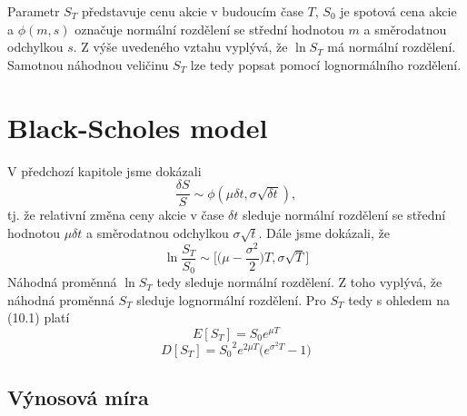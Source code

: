\documentclass[a4paper]{book}
\begin{document}
Parametr $S_T$ představuje cenu akcie v budoucím čase $T$, $S_0$ je spotová cena akcie a $\phi(m,s)$ označuje normální rozdělení se střední hodnotou $m$ a směrodatnou odchylkou $s$. Z výše uvedeného vztahu vyplývá, že $\ln S_T$ má normální rozdělení. Samotnou náhodnou veličinu $S_T$ lze tedy popsat pomocí lognormálního rozdělení.

\chapter{Black-Scholes model}

V předchozí kapitole jsme dokázali
\begin{equation*}
\frac{\delta S}{S} \sim \phi(\mu \delta t, \sigma \sqrt{\delta t}),
\end{equation*}
tj. že relativní změna ceny akcie v čase $\delta t$ sleduje normální rozdělení se střední hodnotou $\mu \delta t$ a směrodatnou odchylkou $\sigma \sqrt{t}$. Dále jsme dokázali, že
\begin{equation}
\ln \frac{S_T}{S_0} \sim \bigg[ \bigg(\mu - \frac{\sigma^2}{2} \bigg)T, \sigma \sqrt{T} \bigg]
\end{equation}
Náhodná proměnná $\ln S_T$ tedy sleduje normální rozdělení. Z toho vyplývá, že náhodná proměnná $S_T$ sleduje lognormální rozdělení. Pro $S_T$ tedy s ohledem na (10.1) platí
\begin{equation*}
E[S_T]=S_0 e^{\mu T}
\end{equation*}
\begin{equation*}
D[S_T]={S_0}^2e^{2 \mu T} \Big(e^{\sigma^2 T}-1 \Big)
\end{equation*}

\section{Výnosová míra}
\end{document}
